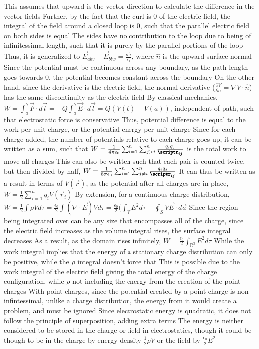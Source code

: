 \documentclass[11 pt, twoside]{article}
\newenvironment{outline*}
{
	\begin{outline}[enumerate]
	}
	{\end{outline}
}
\begin{document}
\begin{outline*}
	\2 This assumes that upward is the vector direction to calculate the difference in the vector fields
	\2 Further, by the fact that the curl is 0 of the electric field, the integral of the field around a closed loop is 0, such that the parallel electric field on both sides is equal
		\3 The sides have no contribution to the loop due to being of infinitessimal length, such that it is purely by the parallel portions of the loop
	\2 Thus, it is generalized to $\vec{E}_{abv} - \vec{E}_{blw} = \frac{\sigma \hat{n}}{\epsilon_0}$, where $\hat{n}$ is the upward surface normal
	\2 Since the potential must be continuous across any boundary, as the path length goes towards 0, the potential becomes constant across the boundary
		\3 On the other hand, since the derivative is the electric field, the normal derivative ($\frac{\partial V}{\partial n} = \nabla V \cdot \hat{n}$) has the same discontinuity as the electric field
\1 By classical mechanics, $W = \int^b_a \vec{F} \cdot d\vec{l} = -Q\int^b_a \vec{E} \cdot d\vec{l} = Q(V(b) - V(a))$, independent of path, such that electrostatic force is conservative
	\2 Thus, potential difference is equal to the work per unit charge, or the potential energy per unit charge
	\2 Since for each charge added, the number of potentials relative to each charge goes up, it can be written as a sum, such that $W = \frac{1}{4\pi\epsilon_0} \sum_{i = 1}^n \sum_{j > i}^n \frac{q_iq_j}{\pmb{\scriptr_{ij}}}$ is the total work to move all charges
		\3 This can also be written such that each pair is counted twice, but then divided by half, $W = \frac{1}{8\pi\epsilon_0} \sum_{i = 1}^n \sum_{j \neq i}^n \frac{q_iq_j}{\pmb{\scriptr_{ij}}}$
			\4 It can thus be written as a result in terms of $V(\vec{r})$, as the potential after all charges are in place, $W = \frac{1}{2}\sum_{i = 1}^n q_iV(\vec{r}_i)$
		\3 By extension, for a continuous charge distribution, $W = \frac{1}{2}\int \rho V d\tau = \frac{\epsilon_0}{2}\int (\nabla \cdot \vec{E})Vd\tau = \frac{\epsilon_0}{2}(\int_V E^2d\tau + \oint_S V\vec{E} \cdot d\vec{a}$
			\4 Since the region being integrated over can be any size that encompasses all of the charge, since the electric field increases as the volume integral rises, the surface integral decreases
			\4 As a result, as the domain rises infinitely, $W = \frac{\epsilon_0}{2}\int_{\mathbb{R}^3} E^2 d\tau$
	\2 While the work integral implies that the energy of a stationary charge distribution can only be positive, while the $\rho$ integral doesn't force that
		\3 This is possible due to the work integral of the electric field giving the total energy of the charge configuration, while $\rho$ not including the energy from the creation of the point charges
		\3 With point charges, since the potential created by a point charge is non-infintessimal, unlike a charge distribution, the energy from it would create a problem, and must be ignored
	\2 Since electrostatic energy is quadratic, it does not follow the principle of superposition, adding extra terms
	\2 The energy is neither considered to be stored in the charge or field in electrostatics, though it could be though to be in the charge by energy density $\frac{1}{2}\rho V$ or the field by $\frac{\epsilon_0}{2}E^2$
\end{outline*}
\end{document}
